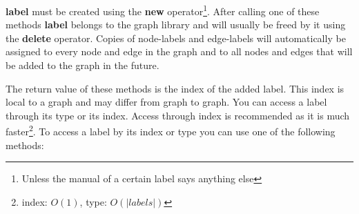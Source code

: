 {\bf label} must be created using the {\bf new}
operator\footnote{Unless the manual of a certain label says
  anything else}. After calling one of these methods {\bf label}
belongs to the graph library and will usually be freed by it
using the {\bf delete} operator. Copies of node-labels and
edge-labels will automatically be assigned to every node and edge
in the graph and to all nodes and edges that will be added to the
graph in the future.

The return value of these methods is the index of the added
label. This index is local to a graph and may differ from graph
to graph. You can access a label through its type or its index.
Access through index is recommended as it is much
faster\footnote{index: $O(1)$, type: $O(|labels|)$}. To access a label by
its index or type you can use one of the following methods:

